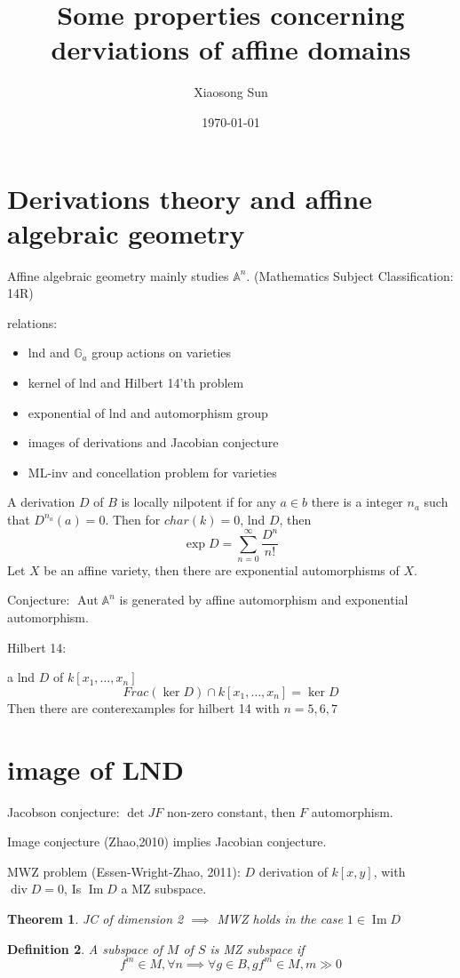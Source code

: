 \documentclass{article}
\title{Some properties concerning derviations of affine domains}
\author{Xiaosong Sun}
\date{\today}
\newtheorem{definition}{Definition}[section]
\newtheorem{theorem}[definition]{Theorem}
\begin{document}
\maketitle
\section{Derivations theory and affine algebraic geometry}
Affine algebraic geometry mainly studies $\mathbb{A}^{n}$. (Mathematics Subject Classification: 14R)

relations:
\begin{itemize}
  \item lnd and $\mathbb{G}_{a}$ group actions on varieties
  \item kernel of lnd and Hilbert 14'th problem
  \item exponential of lnd and automorphism group
  \item images of derivations and Jacobian conjecture
  \item ML-inv and concellation problem for varieties
\end{itemize}

A derivation $D$ of $B$ is locally nilpotent if for any $a\in b$ there is a integer $n_{a}$ such that $D^{n_{a}}(a)=0$. Then for $char(k)=0$, lnd $D$, then
\[
  \exp D=\sum_{n=0}^{\infty}\frac{D^{n}}{n!}
\]
Let $X$ be an affine variety, then there are exponential automorphisms of $X$.

Conjecture: $ \operatorname{Aut} \mathbb{A}^{n}$ is generated by affine automorphism and exponential automorphism.

Hilbert 14:

a lnd $D$ of $k[x_{1},\ldots ,x_{n}]$
\[
  Frac ( \ker D) \cap  k[x_{1},\ldots ,x_{n}]= \ker D
\]
Then there are conterexamples for hilbert 14 with $n=5,6,7$
\section{image of LND}
Jacobson conjecture: $ \operatorname{det} JF $ non-zero constant, then $F$ automorphism.

Image conjecture (Zhao,2010) implies Jacobian conjecture.

MWZ problem (Essen-Wright-Zhao, 2011): $D$ derivation of $k[x,y]$, with $ \operatorname{div} D=0$, Is $ \operatorname{Im} D$ a MZ subspace.

\begin{theorem}
  JC of dimension 2 $\implies$ MWZ holds in the case $1\in \operatorname{Im} D$
\end{theorem}
\begin{definition}
  A subspace of $M$ of $S$ is MZ subspace if 
  \[
    f^{m}\in M ,\forall n \implies \forall g \in B, gf^{m}\in M, m \gg 0
  \]
\end{definition}
\end{document}
